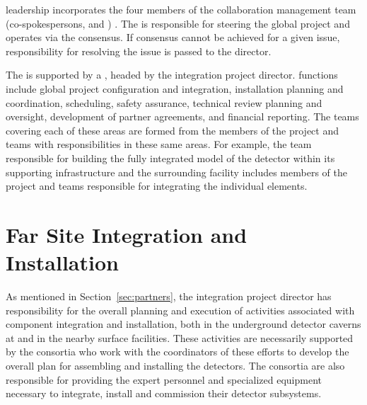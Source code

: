  leadership incorporates the four members of the 
collaboration management team (co-spokespersons,  and
) .  The  is responsible for steering the global
project and operates via the consensus.  %
If consensus cannot be achieved for a given issue, responsibility for
resolving the issue is passed to the  director.

The  is supported by a , headed by the
integration project director.   functions include global project
configuration and integration, installation planning and coordination,
scheduling, safety assurance, technical review planning and oversight,
development of partner agreements, and financial reporting.  The 
teams covering each of these areas are formed from the members of the
 project and   teams with
responsibilities in these same areas. %
For example, the  team
responsible for building the fully integrated model of the detector
within its supporting infrastructure and the surrounding facility
includes members of the  project and  
teams responsible for integrating the individual elements.

\section{Far Site Integration and Installation}
\label{sec:far_site}
 
As mentioned in Section~\ref{sec:partners}, the integration project director has
responsibility for the overall planning and execution of activities
associated with component integration and installation, both in the
 underground detector caverns at  and in the nearby surface facilities. 
These activities are necessarily supported by the  consortia who
work with the coordinators of these efforts to develop the overall
plan for assembling and installing the detectors.  The consortia are
also responsible for providing the expert personnel and specialized
equipment necessary to integrate, install and commission their
detector subsystems.

